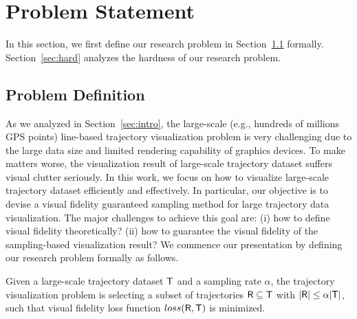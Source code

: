 \section{Problem Statement}\label{sec:pro}
In this section, we first define our research problem in Section~\ref{sec:def} formally.
Section~\ref{sec:hard} analyzes the hardness of our research problem.

\subsection{Problem Definition}\label{sec:def}
As we analyzed in Section~\ref{sec:intro}, the large-scale (e.g., hundreds of millions GPS points) line-based trajectory visualization problem is very challenging due to the large data size and limited rendering capability of graphics devices.
To make matters worse, the visualization result of large-scale trajectory dataset suffers visual clutter seriously.
In this work, we focus on how to visualize large-scale trajectory dataset efficiently and effectively.
In particular, our objective is to devise a visual fidelity guaranteed sampling method for large trajectory data visualization.
The major challenges to achieve this goal are:
(i) how to define visual fidelity theoretically? (ii) how to guarantee the visual fidelity of the sampling-based visualization result?
We commence our presentation by defining our research problem formally as follows.

\begin{problem}\label{prob:def}
Given a large-scale trajectory dataset $\mathsf{T}$ and a sampling rate $\alpha$,
the trajectory visualization problem is selecting a subset of trajectories $\mathsf{R} \subseteq \mathsf{T}$ with $|\mathsf{R}| \leq \alpha |\mathsf{T}|$,
such that visual fidelity loss function $loss(\mathsf{R},\mathsf{T})$ is minimized.
\end{problem}



